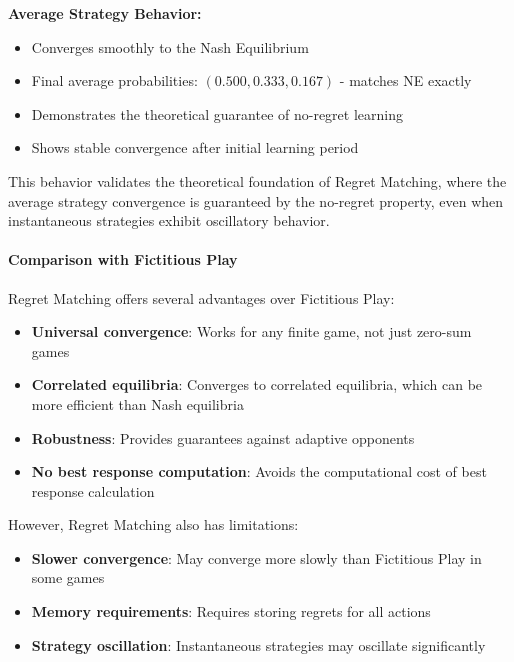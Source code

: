 \documentclass[conference]{IEEEtran}
\begin{document}
\textbf{Average Strategy Behavior:}
\begin{itemize}
    \item Converges smoothly to the Nash Equilibrium
    \item Final average probabilities: $(0.500, 0.333, 0.167)$ - matches NE exactly
    \item Demonstrates the theoretical guarantee of no-regret learning
    \item Shows stable convergence after initial learning period
\end{itemize}

This behavior validates the theoretical foundation of Regret Matching, where the average strategy convergence is guaranteed by the no-regret property, even when instantaneous strategies exhibit oscillatory behavior.

\paragraph{Comparison with Fictitious Play}

Regret Matching offers several advantages over Fictitious Play:

\begin{itemize}
    \item \textbf{Universal convergence}: Works for any finite game, not just zero-sum games
    \item \textbf{Correlated equilibria}: Converges to correlated equilibria, which can be more efficient than Nash equilibria
    \item \textbf{Robustness}: Provides guarantees against adaptive opponents
    \item \textbf{No best response computation}: Avoids the computational cost of best response calculation
\end{itemize}

However, Regret Matching also has limitations:

\begin{itemize}
    \item \textbf{Slower convergence}: May converge more slowly than Fictitious Play in some games
    \item \textbf{Memory requirements}: Requires storing regrets for all actions
    \item \textbf{Strategy oscillation}: Instantaneous strategies may oscillate significantly
\end{itemize}

\end{document}
